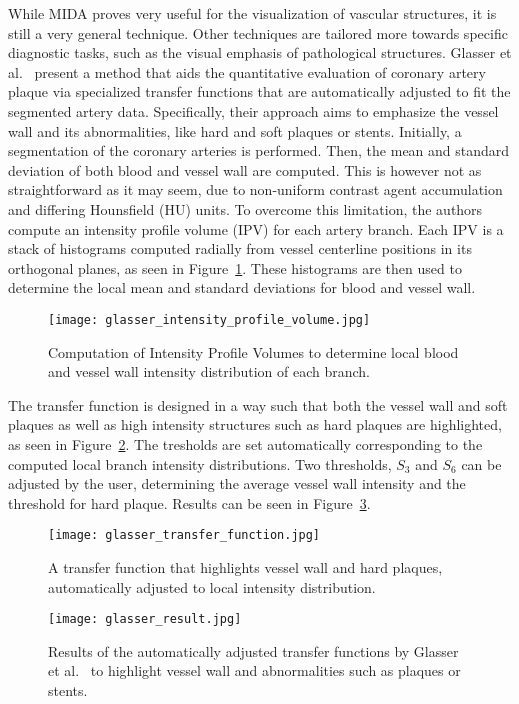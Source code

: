 While MIDA proves very useful for the visualization of vascular structures, it is still a very general technique. Other techniques are tailored more towards specific diagnostic tasks, such as the visual emphasis of pathological structures. Glasser et al.~\cite{glasser2010automatic} present a method that aids the quantitative evaluation of coronary artery plaque via specialized transfer functions that are automatically adjusted to fit the segmented artery data. Specifically, their approach aims to emphasize the vessel wall and its abnormalities, like hard and soft plaques or stents. Initially, a segmentation of the coronary arteries is performed. Then, the mean and standard deviation of both blood and vessel wall are computed. This is however not as straightforward as it may seem, due to non-uniform contrast agent accumulation and differing Hounsfield (HU) units. To overcome this limitation, the authors compute an intensity profile volume (IPV) for each artery branch. Each IPV is a stack of histograms computed radially from vessel centerline positions in its orthogonal planes, as seen in Figure~\ref{fig:glasserIPV}. These histograms are then used to determine the local mean and standard deviations for blood and vessel wall.
\begin{figure}[htb]
  \centering
  \texttt{[image: glasser\_intensity\_profile\_volume.jpg]}
  \caption{\label{fig:glasserIPV} Computation of Intensity Profile Volumes to determine local blood and vessel wall intensity distribution of each branch.}
\end{figure}
The transfer function is designed in a way such that both the vessel wall and soft plaques as well as high intensity structures such as hard plaques are highlighted, as seen in Figure~\ref{fig:glasserTransferFunction}. The tresholds are set automatically corresponding to the computed local branch intensity distributions. Two thresholds, $S_3$ and $S_6$ can be adjusted by the user, determining the average vessel wall intensity and the threshold for hard plaque. Results can be seen in Figure~\ref{fig:glasserResult}.
\begin{figure}[htb]
  \centering
  \texttt{[image: glasser\_transfer\_function.jpg]}
  \caption{\label{fig:glasserTransferFunction} A transfer function that highlights vessel wall and hard plaques, automatically adjusted to local intensity distribution.}
\end{figure}
\begin{figure}[htb]
  \centering
  \texttt{[image: glasser\_result.jpg]}
  \caption{\label{fig:glasserResult} Results of the automatically adjusted transfer functions by Glasser et al.~\cite{glasser2010automatic} to highlight vessel wall and abnormalities such as plaques or stents.}
\end{figure}

